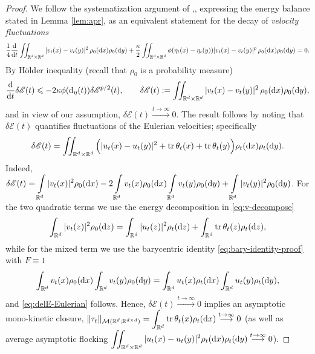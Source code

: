 \documentclass[10pt,reqno]{amsart}
\newcommand{\delE}{\delta{\mathscr E}}
\renewcommand{\leq}{\leqslant}
\numberwithin{equation}{section}
\newcommand{\R}{\mathbb R}
\newcommand{\intr}{\int_{\R^d}}
\newcommand{\intrr}{\iint_{\R^d \times \R^d}}
\newcommand{\calM}{\mathcal M}
\newcommand{\rd}{\textnormal{d}}
\newcommand{\dx}{\textnormal{d}x}
\newcommand{\dt}{\textnormal{d}t}
\newcommand{\dy}{\textnormal{d}y}
\newcommand{\dz}{\textnormal{d}z}
\begin{document}
\begin{proof}
We follow the systematization argument of \cite[\S4]{Tad23},\cite[\S3]{Tadpre}, expressing  the energy balance stated in Lemma \ref{lem:apr}, as an equivalent  statement for the decay of \emph{velocity fluctuations}
\[
\frac14 \frac{\rd}{\dt} \intrr |v_t(x)-v_t(y)|^2\,\rho_0(\dx)\rho_0(\dy) + \frac\kappa2\intrr \phi(\eta_t(x)-\eta_t(y))|v_t(x) - v_t(y)|^p \,\rho_0(\dx) \rho_0(\dy) =0.
\]
By H\"{o}lder inequality (recall that $\rho_0$ is a probability measure)
\[
\frac{\rd}{\dt} \delE(t) \leq -2\kappa \phi(\rd_\eta(t)) \delE^{p/2}(t), \qquad \delE(t):=\intrr |v_t(x)-v_t(y)|^2\,\rho_0(\dx)\rho_0(\dy),
\]
and in view of our assumption, $\delE(t) \stackrel{t\rightarrow \infty}{\longrightarrow}0$.
The result follows by noting that $\delE(t)$ quantifies fluctuations of the Eulerian velocities; specifically
\begin{equation}\label{eq:delE-Eulerian}
\delE(t)=\intrr \Big(|u_t(x)-u_t(y)|^2 + {\rm tr}\, \theta_t(x) + {\rm tr}\, \theta_t(y)\Big)\rho_t(\dx)\rho_t(\dy).
\end{equation}
Indeed, $\displaystyle 
\delE(t)=\int \limits_{\R^d}|v_t(x)|^2\rho_0(\dx) -2\int \limits_{\R^d}  v_t(x)\rho_0(\dx)\int \limits_{\R^d}  v_t(y)\rho_0(\dy)+\int \limits_{\R^d}|v_t(y)|^2\rho_0(\dy)$.
For the two quadratic terms we use  the energy decomposition in \eqref{eq:v-decompose}
\[
\intr|v_t(z)|^2\rho_0(\dz)=\intr|u_t(z)|^2\rho_t(\dz)+\intr {\rm tr}\,\theta_t(z)\rho_t(\dz),
\]
while for the mixed term we use the barycentric identity 
\eqref{eq:bary-identity-proof} with $F\equiv1$
\[
\intr  v_t(x)\rho_0(\dx)\intr  v_t(y)\rho_0(\dy)=\intr  u_t(x)\rho_t(\dx)\intr  u_t(y)\rho_t(\dy),
\]
and \eqref{eq:delE-Eulerian} follows.
Hence, $\delE(t) \stackrel{t\rightarrow \infty}{\longrightarrow}0$ implies   an asymptotic mono-kinetic closure,  $\displaystyle \|\tau_t\|_{\calM(\R^d;\R^{d\times d})}=\intr {\rm tr}\,\theta_t(x)\rho_t(\dx) \stackrel{t\rightarrow \infty}{\longrightarrow}0$ (as well as average asymptotic  flocking $\displaystyle \intrr |u_t(x)-u_t(y)|^2 \rho_t(\dx)\rho_t(\dy)\stackrel{t\rightarrow \infty}{\longrightarrow}0$). 


\end{proof}
\end{document}
